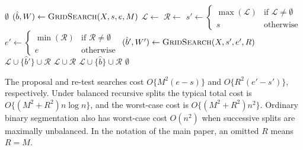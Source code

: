 \documentclass[12pt, a4paper]{article}
\begin{document}
\begin{algorithm}[H]
{\footnotesize
\caption{LABS with grid-based contrast evaluation (LABS-Grid)}
\label{alg:labs_grid}
\begin{algorithmic}[1]
    \If{the $M$-grid search cannot be evaluated on $(s,e]$ (interval too short)}
        \State \Return $\emptyset$
    \EndIf
    \State $(\hat{b}, W) \gets \textsc{GridSearch}(X, s, e, M)$ \Comment{Proposal search on $(s, e]$}
     
        \State $\mathcal{L} \gets$ 
        \State $\mathcal{R} \gets$ 
        \State {}
            \State $s' \gets \begin{cases} \max(\mathcal{L}) & \text{if } \mathcal{L} \neq \emptyset \\ s & \text{otherwise} \end{cases}$
            \State $e' \gets \begin{cases} \min(\mathcal{R}) & \text{if } \mathcal{R} \neq \emptyset \\ e & \text{otherwise} \end{cases}$
            \If{the $R$-grid search can be evaluated on $(s',e']$}
                \State $(\hat{b}', W') \gets \textsc{GridSearch}(X, s', e', R)$ \Comment{Grid re-test on $(s', e']$}
                    \State \Return $\mathcal{L} \cup \{\hat{b}'\} \cup \mathcal{R}$ 
                \EndIf
            \EndIf
            \State \Return $\mathcal{L} \cup \mathcal{R}$ 
        \EndIf
        \State \Return $\mathcal{L} \cup \{\hat{b}\} \cup \mathcal{R}$ 
    \Else
        \State \Return $\emptyset$
    \EndIf
\EndFunction
\end{algorithmic}
}
\end{algorithm}

The proposal and re-test searches cost $O\{M^2(e-s)\}$ and $O\{R^2(e'-s')\}$, respectively. Under balanced recursive splits the typical total cost is $O\{(M^2+R^2)n\log n\}$, and the worst-case cost is $O\{(M^2+R^2)n^2\}$. Ordinary binary segmentation also has worst-case cost $O(n^2)$ when successive splits are maximally unbalanced. In the notation of the main paper, an omitted $R$ means $R=M$.
\end{document}
